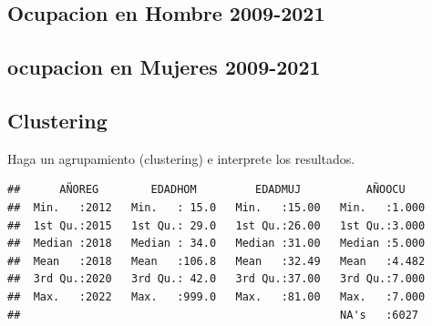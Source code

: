\documentclass[
]{article}
\newenvironment{Shaded}{\begin{snugshade}}{\end{snugshade}}
\newcommand{\FunctionTok}[1]{\textcolor[rgb]{0.00,0.00,0.00}{#1}}
\newcommand{\NormalTok}[1]{#1}
\newcommand{\OtherTok}[1]{\textcolor[rgb]{0.56,0.35,0.01}{#1}}
\newcommand{\SpecialCharTok}[1]{\textcolor[rgb]{0.00,0.00,0.00}{#1}}
\newcommand{\StringTok}[1]{\textcolor[rgb]{0.31,0.60,0.02}{#1}}
\begin{document}
\hypertarget{ocupacion-en-hombre-2009-2021}{%
\subsection{Ocupacion en Hombre
2009-2021}\label{ocupacion-en-hombre-2009-2021}}

\hypertarget{ocupacion-en-mujeres-2009-2021}{%
\subsection{ocupacion en Mujeres
2009-2021}\label{ocupacion-en-mujeres-2009-2021}}

\hypertarget{clustering}{%
\subsection{Clustering}\label{clustering}}

Haga un agrupamiento (clustering) e interprete los resultados.

\begin{Shaded}
\end{Shaded}

\begin{verbatim}
##      AÑOREG        EDADHOM         EDADMUJ          AÑOOCU     
##  Min.   :2012   Min.   : 15.0   Min.   :15.00   Min.   :1.000  
##  1st Qu.:2015   1st Qu.: 29.0   1st Qu.:26.00   1st Qu.:3.000  
##  Median :2018   Median : 34.0   Median :31.00   Median :5.000  
##  Mean   :2018   Mean   :106.8   Mean   :32.49   Mean   :4.482  
##  3rd Qu.:2020   3rd Qu.: 42.0   3rd Qu.:37.00   3rd Qu.:7.000  
##  Max.   :2022   Max.   :999.0   Max.   :81.00   Max.   :7.000  
##                                                 NA's   :6027
\end{verbatim}
\end{document}
